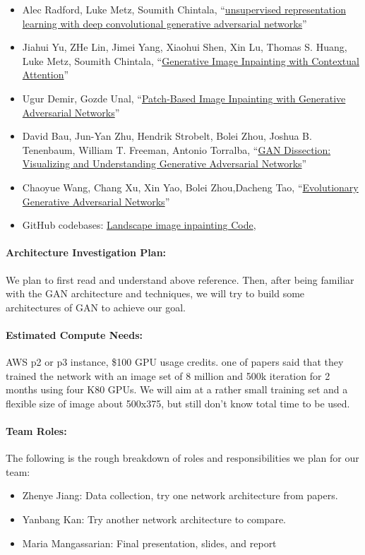 \documentclass[11pt]{article}
\begin{document}
\begin{itemize} 
\item Alec Radford, Luke Metz, Soumith Chintala, ``\href{https://arxiv.org/pdf/1511.06434.pdf}{unsupervised representation learning with deep convolutional generative adversarial networks}'' 
\item Jiahui Yu, ZHe Lin, Jimei Yang, Xiaohui Shen, Xin Lu, Thomas S. Huang, Luke Metz, Soumith Chintala, ``\href{http://openaccess.thecvf.com/content_cvpr_2018/papers/Yu_Generative_Image_Inpainting_CVPR_2018_paper.pdf}{Generative Image Inpainting with Contextual Attention}'' 
\item Ugur Demir, Gozde Unal, ``\href{https://arxiv.org/pdf/1803.07422.pdf}{Patch-Based Image Inpainting with Generative Adversarial Networks}'' 
\item David Bau, Jun-Yan Zhu, Hendrik Strobelt, Bolei Zhou, Joshua B. Tenenbaum, William T. Freeman, Antonio Torralba, ``\href{https://arxiv.org/pdf/1811.10597.pdf}{GAN Dissection: Visualizing and Understanding Generative Adversarial Networks}'' 
\item Chaoyue Wang,  Chang Xu, Xin Yao, Bolei Zhou,Dacheng Tao, ``\href{https://arxiv.org/pdf/1803.00657.pdf}{Evolutionary Generative Adversarial Networks}'' 

\item GitHub codebases: \href{https://github.com/tron32213021/ee599-GAN-Project} {Landscape image inpainting Code},  
\end{itemize} 


\paragraph{Architecture Investigation Plan:}  We plan to first read and understand above reference. Then, after being familiar with the GAN architecture and techniques, we will try to build some architectures of GAN to achieve our goal.

\paragraph{Estimated Compute Needs:}  AWS p2 or p3 instance, \$100 GPU usage credits. one of papers said that they trained the network with an image set of 8 million and 500k iteration for 2 months using four K80 GPUs. We will aim at a rather small training set and a flexible size of image about 500x375, but still don't know total time to be used. 

\paragraph{Team Roles:} The following is the rough breakdown of roles and responsibilities we plan for our team:
\begin{itemize}
\item Zhenye Jiang: Data collection, try one network architecture from papers.
\item Yanbang Kan: Try another network architecture to compare.
\item Maria Mangassarian: Final presentation, slides, and report
\end{itemize}


 
\end{document}
